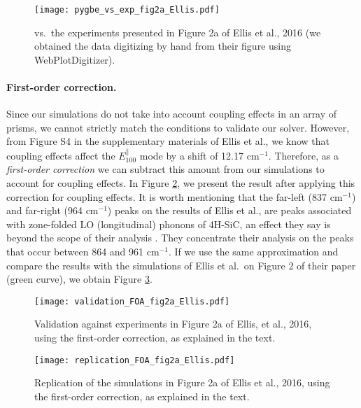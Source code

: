 \begin{figure}
    \centering
    \texttt{[image: pygbe\_vs\_exp\_fig2a\_Ellis.pdf]} 
    \caption{\pygbe vs.\ the experiments presented in Figure 2a of Ellis et al., 2016 (we obtained the data 
    digitizing by hand from their figure using WebPlotDigitizer).}
    \label{fig:pygbe_vs_exp_2a}
 \end{figure}

\paragraph{First-order correction.}

Since our simulations do not take into account coupling effects in an array of prisms, we cannot strictly match 
the conditions to validate our solver. However, from Figure S4 in the supplementary 
materials of Ellis et al., we know that coupling effects affect the $E^{\parallel}_{100}$ 
mode by a shift of 12.17 cm$^{-1}$. Therefore, as a \textit{first-order correction} we can 
subtract this amount from our simulations to account for coupling effects. In Figure 
\ref{fig:val_2a}, we present the result after applying this correction for coupling effects.
It is worth mentioning that the far-left (837 cm$^{-1}$) and far-right (964 cm$^{-1}$) peaks 
on the results of Ellis et al., are peaks associated with zone-folded LO (longitudinal) phonons of 4H-SiC,
an effect they say is beyond the scope of their analysis \cite{ellis2016}. They concentrate their analysis on the peaks that occur between 864 and 961 cm$^{-1}$.
If we use the same approximation and compare the results with the simulations of Ellis et al.\ on
Figure 2 of their paper (green curve), we obtain Figure \ref{fig:rep_2a}.

\begin{figure}
    \centering
    \texttt{[image: validation\_FOA\_fig2a\_Ellis.pdf]} 
    \caption{Validation against experiments in Figure 2a of Ellis, et al., 2016, using the first-order correction, as explained in the text.}
    \label{fig:val_2a}
 \end{figure}

\begin{figure}
    \centering
    \texttt{[image: replication\_FOA\_fig2a\_Ellis.pdf]} 
    \caption{Replication of the simulations in Figure 2a of Ellis et al., 2016, using the first-order correction, as explained in the text.}
    \label{fig:rep_2a}
 \end{figure}
 
